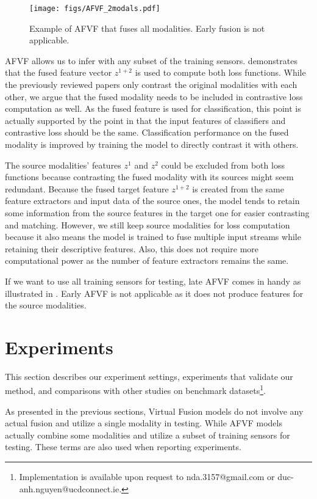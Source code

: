 \documentclass[conference]{IEEEtran}
\begin{document}
\begin{figure}[!t]
\captionsetup{justification=centering}
\centerline{\texttt{[image: figs/AFVF\_2modals.pdf]}}
\caption{Example of AFVF that fuses all modalities. Early fusion is not applicable.}
\label{fig: afvf fuse all}
\end{figure}
AFVF allows us to infer with any subset of the training sensors.  demonstrates that the fused feature vector $z^{1+2}$ is used to compute both loss functions. While the previously reviewed papers only contrast the original modalities with each other, we argue that the fused modality needs to be included in contrastive loss computation as well. As the fused feature is used for classification, this point is actually supported by the point in  that the input features of classifiers and contrastive loss should be the same. Classification performance on the fused modality is improved by training the model to directly contrast it with others.

The source modalities' features $z^1$ and $z^2$ could be excluded from both loss functions because contrasting the fused modality with its sources might seem redundant. Because the fused target feature $z^{1+2}$ is created from the same feature extractors and input data of the source ones, the model tends to retain some information from the source features in the target one for easier contrasting and matching. However, we still keep source modalities for loss computation because it also means the model is trained to fuse multiple input streams while retaining their descriptive features. Also, this does not require more computational power as the number of feature extractors remains the same.

If we want to use all training sensors for testing, late AFVF comes in handy as illustrated in . Early AFVF is not applicable 
as it does not produce features for the source modalities.

\section{Experiments}
This section describes our experiment settings, experiments that validate our method, and comparisons with other studies on benchmark datasets\footnote{Implementation is available upon request to nda.3157@gmail.com or duc-anh.nguyen@ucdconnect.ie.}.

As presented in the previous sections, Virtual Fusion models do not involve any actual fusion and utilize a single modality in testing. While AFVF models actually combine some modalities and utilize a subset of training sensors for testing. These terms are also used when reporting experiments.
\end{document}
